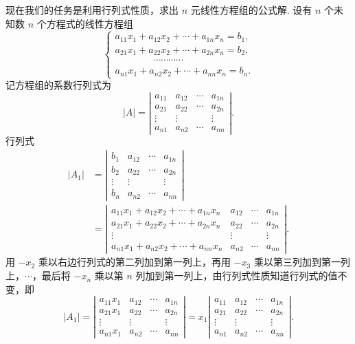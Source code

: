 \documentclass[UTF8, 12pt, fontset=fandol, oneside]{ctexart}
\begin{document}
现在我们的任务是利用行列式性质，求出 $n$ 元线性方程组的公式解. 设有 $n$ 个未知数 $n$ 个方程式的线性方程组
\begin{equation}
\left\{
\begin{array}{l}
a_{11}x_1+a_{12}x_2+\cdots+a_{1n}x_n=b_1,\\
a_{21}x_1+a_{22}x_2+\cdots+a_{2n}x_n=b_2,\\
\hspace{4em}\cdots\cdots\cdots\cdots\\
a_{n1}x_1+a_{n2}x_2+\cdots+a_{nn}x_n=b_n.
\end{array}
\right.
\tag{1.4.8}
\end{equation}
记方程组的系数行列式为
\[
|A|=
\left|\begin{array}{cccc}
a_{11} & a_{12} & \cdots & a_{1n}\\
a_{21} & a_{22} & \cdots & a_{2n}\\
\vdots & \vdots & & \vdots\\
a_{n1} & a_{n2} & \cdots & a_{nn}
\end{array}\right|.
\]
行列式
\[
\begin{aligned}
|A_1|
&=
\left|\begin{array}{cccc}
b_1 & a_{12} & \cdots & a_{1n}\\
b_2 & a_{22} & \cdots & a_{2n}\\
\vdots & \vdots & & \vdots\\
b_n & a_{n2} & \cdots & a_{nn}
\end{array}\right|\\
&=
\left|\begin{array}{cccc}
a_{11}x_1+a_{12}x_2+\cdots+a_{1n}x_n & a_{12} & \cdots & a_{1n}\\
a_{21}x_1+a_{22}x_2+\cdots+a_{2n}x_n & a_{22} & \cdots & a_{2n}\\
\vdots & \vdots & & \vdots\\
a_{n1}x_1+a_{n2}x_2+\cdots+a_{nn}x_n & a_{n2} & \cdots & a_{nn}
\end{array}\right|.
\end{aligned}
\]
用 $-x_2$ 乘以右边行列式的第二列加到第一列上，再用 $-x_3$ 乘以第三列加到第一列上，$\cdots$，最后将 $-x_n$ 乘以第 $n$ 列加到第一列上，由行列式性质知道行列式的值不变，即
\[
|A_1|=
\left|\begin{array}{cccc}
a_{11}x_1 & a_{12} & \cdots & a_{1n}\\
a_{21}x_1 & a_{22} & \cdots & a_{2n}\\
\vdots & \vdots & & \vdots\\
a_{n1}x_1 & a_{n2} & \cdots & a_{nn}
\end{array}\right|
=x_1
\left|\begin{array}{cccc}
a_{11} & a_{12} & \cdots & a_{1n}\\
a_{21} & a_{22} & \cdots & a_{2n}\\
\vdots & \vdots & & \vdots\\
a_{n1} & a_{n2} & \cdots & a_{nn}
\end{array}\right|.
\]
\end{document}
